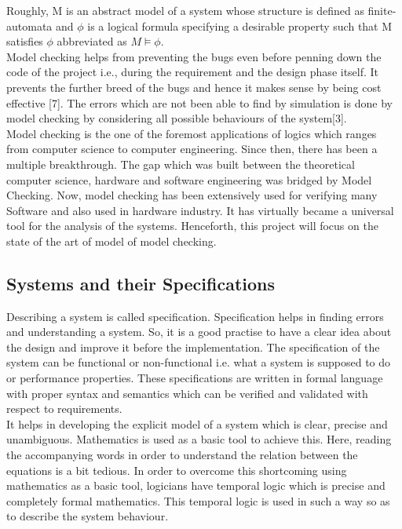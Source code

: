 \documentclass[a4paper,12pt]{extarticle}
\begin{document}
Roughly, M is an abstract model of a system whose structure is defined as finite-automata and $\phi$  is a logical formula specifying a desirable property such that M satisfies $\phi$  abbreviated as $M \models \phi$. \\
Model checking helps from preventing the bugs even before penning down the code of the project i.e., during the requirement and the design phase itself. It prevents the further breed of the bugs and hence it makes sense by being cost effective [7]. The errors which are not been able to find by simulation is done by model checking by considering all possible behaviours of the system[3]. \\
Model checking is the one of the foremost applications of logics which ranges from computer science to computer engineering. Since then, there has been a multiple breakthrough. The gap which was built between the theoretical computer science, hardware and software engineering was bridged by Model Checking. Now, model checking has been extensively used for verifying many Software and also used in hardware industry. It has virtually became a universal tool for the analysis of the systems. Henceforth, this project will focus on the state of the art of model of model checking.
\subsection{Systems and their Specifications}
\label{Sys and Spec}
Describing a system is called specification. Specification helps in finding errors and    understanding a system. So, it is a good practise to have a clear idea about the design and improve it before the implementation. The specification of the system can be functional or non-functional i.e. what a system is supposed to do or performance properties. These specifications are written in formal language with proper syntax and semantics which can be verified and validated with respect to requirements.\\ 
It helps in developing the explicit model of a system which is clear, precise and unambiguous. Mathematics is used as a basic tool to achieve this. Here, reading the accompanying words in order to understand the relation between the equations is a bit tedious. In order to overcome this shortcoming using mathematics as a basic tool, logicians have temporal logic which is precise and completely formal mathematics. This temporal logic is used in such a way so as to describe the system behaviour. 
\end{document}
